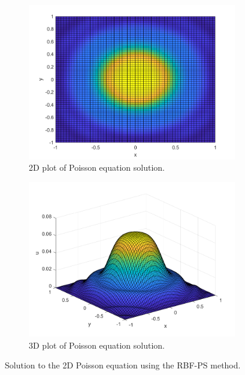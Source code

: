 \begin{solution}
    \begin{figure}[h]
        \centering
        \begin{subfigure}{0.49\textwidth}
            \centering
            \includegraphics[width=\textwidth]{problem_3ii_poisson_2d.png}
            \caption{2D plot of Poisson equation solution.}
            \label{fig:problem_3i_poisson_2d}
        \end{subfigure}
        \begin{subfigure}{0.49\textwidth}
            \centering
            \includegraphics[width=\textwidth]{problem_3ii_poisson_3d.png}
            \caption{3D plot of Poisson equation solution.}
            \label{fig:problem_3i_poisson_3d}
        \end{subfigure}
        \caption{Solution to the 2D Poisson equation using the RBF-PS method.}
        \label{fig:problem_3ii_poisson}
    \end{figure}
\end{solution}